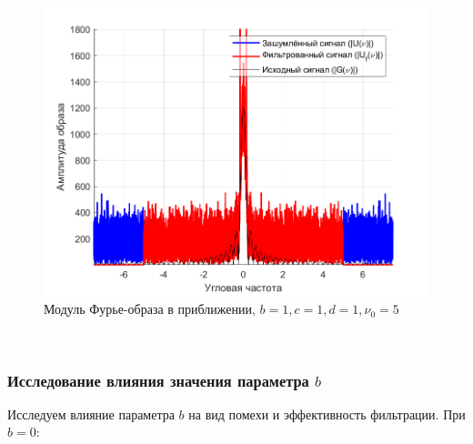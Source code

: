 \documentclass[a4paper]{article}
\begin{document}
\begin{figure}[H]
    \centering
    \includegraphics[width=0.5\linewidth]{part2/1_1_1_Fourier_scaled.png}
    \caption{Модуль Фурье-образа в приближении, $b = 1, c = 1, d = 1, \nu_0 = 5$}
\end{figure}\

\subsubsection{Исследование влияния значения параметра $b$}

Исследуем влияние параметра $b$ на вид помехи и эффективность фильтрации. При $b = 0$:
\end{document}
